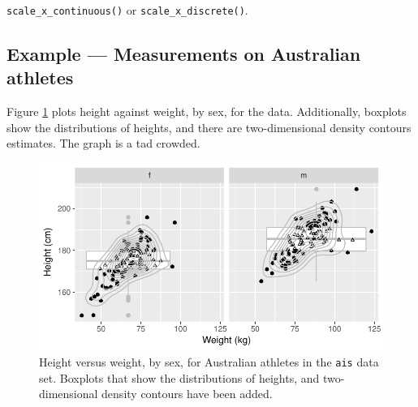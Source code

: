 \begin{fullwidth}
\begin{table}
\begin{center}
\begin{minipage}[t]{0.975\textwidth}
{  \texttt{scale\_x\_continuous()} or
  \texttt{scale\_x\_discrete()}.}
\setcounter{footnote}{\value{mpfootnote}}
\end{minipage}
\end{center}
\end{table}
\end{fullwidth}
\enlargethispage{9pt}

\subsection*{Example --- Measurements on Australian athletes}

Figure \ref{fig:ggais} plots height against weight, by sex, for the
 data. Additionally, boxplots show the distributions of
heights, and there are two-dimensional density contours estimates.
The graph is a tad crowded.

\begin{figure}
\begin{Schunk}


\centerline{\includegraphics[width=\textwidth]{figs/09-overlay-dens-frills-1} }

\end{Schunk}
\caption{Height versus weight, by sex, for Australian athletes in the
\texttt{ais} data set. Boxplots that show the distributions of heights,
and two-dimensional density contours have been
added.\label{fig:ggais}}
\end{figure}

